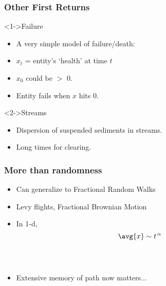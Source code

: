 
\begin{frame}
  \frametitle{Other First Returns}

  \begin{block}<1->{Failure}
    \begin{itemize}
    \item A very simple model of failure/death:
    \item $x_t$ = entity's `health' at time $t$
    \item $x_0$ could be $>$ 0.
    \item Entity fails when $x$ hits 0.
    \end{itemize}
  \end{block}

  \bigskip

  \begin{block}<2->{Streams}
    \begin{itemize}
    \item
      Dispersion of suspended sediments in streams.
    \item 
      Long times for clearing.
    \end{itemize}
  \end{block}

\end{frame}





\begin{frame}
  \frametitle{More than randomness}
  
  \begin{itemize}
  \item<1->
  Can generalize to Fractional Random Walks
  \item<2-> 
    Levy flights, Fractional Brownian Motion
  \item<3-> 
  In 1-d, $$\avg{x} \sim t^{\, \alpha}$$\\
  \\
  \item<5-> Extensive memory of path now matters...
  \end{itemize}

\end{frame}  


%

